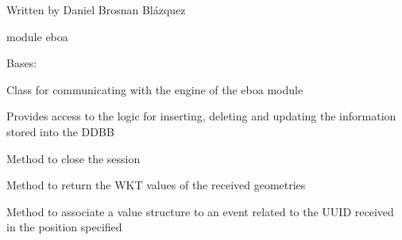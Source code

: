Written by Daniel Brosnan Blázquez

module eboa

\begin{fulllineitems}
\label{\detokenize{eboa.engine:eboa.engine.engine.Engine}}
Bases: 

Class for communicating with the engine of the eboa module

Provides access to the logic for inserting, deleting and updating
the information stored into the DDBB

\begin{fulllineitems}
\label{\detokenize{eboa.engine:eboa.engine.engine.Engine.close_session}}
Method to close the session

\end{fulllineitems}


\begin{fulllineitems}
\label{\detokenize{eboa.engine:eboa.engine.engine.Engine.geometries_to_wkt}}
Method to return the WKT values of the received geometries

\end{fulllineitems}


\begin{fulllineitems}
\label{\detokenize{eboa.engine:eboa.engine.engine.Engine.insert_event_value}}
Method to associate a value structure to an event related to the UUID received in the position specified


\end{fulllineitems}
\end{fulllineitems}
